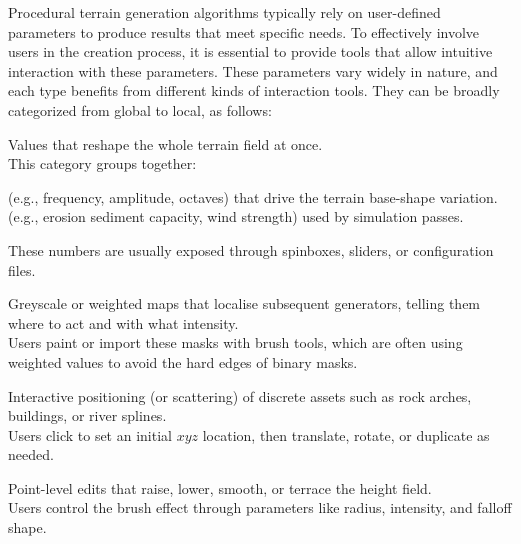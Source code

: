 Procedural terrain generation algorithms typically rely on user-defined parameters to produce results that meet specific needs. To effectively involve users in the creation process, it is essential to provide tools that allow intuitive interaction with these parameters. These parameters vary widely in nature, and each type benefits from different kinds of interaction tools. They can be broadly categorized from global to local, as follows:
\begin{Itemize}
     Values that reshape the whole terrain field at once. \\
    This category groups together:
        \begin{Itemize}
             (e.g., frequency, amplitude, octaves) that drive the terrain base-shape variation.
             (e.g., erosion sediment capacity, wind strength) used by simulation passes.
        \end{Itemize}
        These numbers are usually exposed through spinboxes, sliders, or configuration files.

     Greyscale or weighted maps that localise subsequent generators, telling them where to act and with what intensity. \\
    Users paint or import these masks with brush tools, which are often using weighted values to avoid the hard edges of binary masks.

     Interactive positioning (or scattering) of discrete assets such as rock arches, buildings, or river splines. \\  
    Users click to set an initial $xyz$ location, then translate, rotate, or duplicate as needed.

     Point-level edits that raise, lower, smooth, or terrace the height field. \\
    Users control the brush effect through parameters like radius, intensity, and falloff shape.
\end{Itemize}
